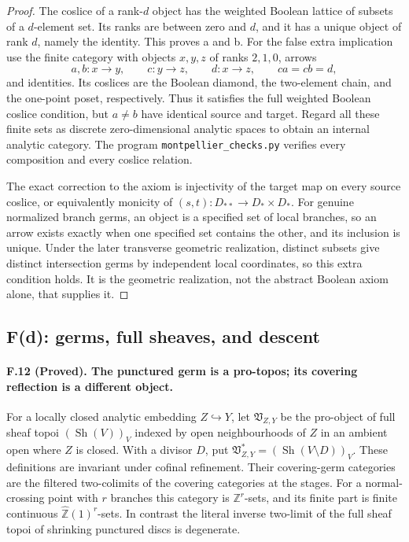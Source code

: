 \begin{proof}
The coslice of a rank-$d$ object has the weighted Boolean lattice of
subsets of a $d$-element set. Its ranks are between zero and $d$, and it
has a unique object of rank $d$, namely the identity. This proves a and b.
For the false extra implication use the finite category with objects
$x,y,z$ of ranks $2,1,0$, arrows
\[
 a,b:x\longrightarrow y,\qquad c:y\longrightarrow z,
 \qquad d:x\longrightarrow z,
 \qquad ca=cb=d,
\]
and identities. Its coslices are the Boolean diamond, the two-element
chain, and the one-point poset, respectively. Thus it satisfies the full
weighted Boolean coslice condition, but $a\ne b$ have identical source
and target. Regard all these finite sets as discrete zero-dimensional
analytic spaces to obtain an internal analytic category. The program
\texttt{montpellier\_checks.py} verifies every composition and every
coslice relation.

The exact correction to the axiom is injectivity of the target map on
every source coslice, or equivalently monicity of
$(s,t):D_{**}\to D_*\times D_*$. For genuine normalized branch germs, an
object is a specified set of local branches, so an arrow exists exactly
when one specified set contains the other, and its inclusion is unique.
Under the later transverse geometric realization, distinct subsets give
distinct intersection germs by independent local coordinates, so this
extra condition holds. It is the geometric realization, not the
abstract Boolean axiom alone, that supplies it.
\end{proof}

\subsection{F(d): germs, full sheaves, and descent}

\paragraph{F.12 (Proved). The punctured germ is a pro-topos; its covering
reflection is a different object.}
For a locally closed analytic embedding $Z\hookrightarrow Y$, let
$\mathfrak V_{Z,Y}$ be the pro-object of full sheaf topoi
$(\operatorname{Sh}(V))_V$ indexed by open neighbourhoods of $Z$ in an
ambient open where $Z$ is closed. With a divisor $D$, put
$\mathfrak V^*_{Z,Y}=(\operatorname{Sh}(V\setminus D))_V$.
These definitions are invariant under cofinal refinement. Their
covering-germ categories are the filtered two-colimits of the covering
categories at the stages. For a normal-crossing point with $r$ branches
this category is $\mathbb Z^r$-sets, and its finite part is finite
continuous $\widehat{\mathbb Z}(1)^r$-sets. In contrast the literal
inverse two-limit of the full sheaf topoi of shrinking punctured discs
is degenerate.

